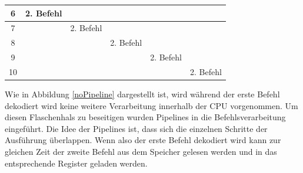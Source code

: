 \documentclass[12pt]{article}
\begin{document}
\begin{table}[!htb]
\begin{tabular}{|c|l|l|l|l|l|}
6    & 2. Befehl                                                                        &                                 &                                                                                 &                                &                                                                                            \\ \hline
7    &                                                                                  & 2. Befehl                       &                                                                                 &                                &                                                                                            \\ \hline
8    &                                                                                  &                                 & 2. Befehl                                                                       &                                &                                                                                            \\ \hline
9    &                                                                                  &                                 &                                                                                 & 2. Befehl                      &                                                                                            \\ \hline
10   &                                                                                  &                                 &                                                                                 &                                & 2. Befehl                                                                                  \\ \hline


\end{tabular}
\end{table}

Wie in Abbildung \ref{noPipeline} dargestellt ist, wird während der erste Befehl dekodiert wird keine weitere Verarbeitung innerhalb der CPU vorgenommen. Um diesen Flaschenhals zu beseitigen wurden Pipelines in die Befehlsverarbeitung eingeführt. Die Idee der Pipelines ist, dass sich die einzelnen Schritte der Ausführung überlappen. Wenn also der erste Befehl dekodiert wird kann zur gleichen Zeit der zweite Befehl aus dem Speicher gelesen werden und in das entsprechende Register geladen werden.
\end{document}
